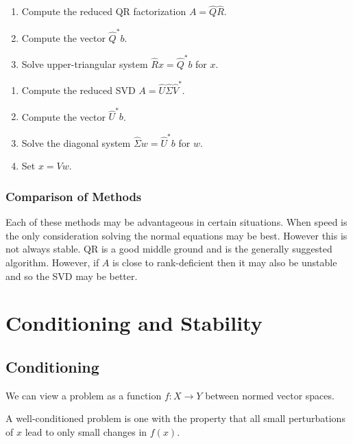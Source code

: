 \documentclass[12pt]{article}
\begin{document}
\begin{method}
\begin{enumerate}[nolistsep]
    \item Compute the reduced QR factorization \( A = \hat{Q}\hat{R} \).
    \item Compute the vector \( \hat{Q}^*b \).
    \item Solve upper-triangular system \( \hat{R}x = \hat{Q}^*b \) for \( x \).
\end{enumerate}
\end{method}

\begin{method}
\begin{enumerate}[nolistsep]
    \item Compute the reduced SVD \( A = \hat{U}\hat{\Sigma}\hat{V}^* \).
    \item Compute the vector \( \hat{U}^*b \).
    \item Solve the diagonal system \( \hat{\Sigma}w = \hat{U}^*b \) for \( w \).
    \item Set \( x = Vw \).
\end{enumerate}
\end{method}

\subsubsection{Comparison of Methods}
Each of these methods may be advantageous in certain situations. When speed is the only consideration solving the normal equations may be best. However this is not always stable. QR is a good middle ground and is the generally suggested algorithm. However, if \( A \) is close to rank-deficient then it may also be unstable and so the SVD may be better.

\section{Conditioning and Stability}
\subsection{Conditioning}
We can view a problem as a function \( f:X\to Y \) between normed vector spaces.

\begin{definition}
A well-conditioned problem is one with the property that all small perturbations of \( x \) lead to only small changes in \( f(x) \).
\end{definition}
\end{document}
